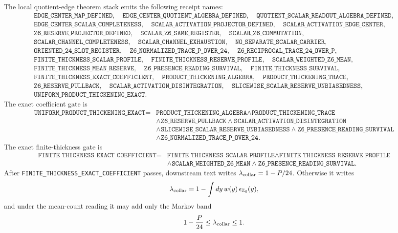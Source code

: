 \documentclass[11pt]{article}
\theoremstyle{remark}
\theoremstyle{plain}
\begin{document}
The local quotient-edge theorem stack emits the following receipt names:
\[
\begin{gathered}
\texttt{EDGE\_CENTER\_MAP\_DEFINED},\quad
\texttt{EDGE\_CENTER\_QUOTIENT\_ALGEBRA\_DEFINED},\quad
\texttt{QUOTIENT\_SCALAR\_READOUT\_ALGEBRA\_DEFINED},\\
\texttt{EDGE\_CENTER\_SCALAR\_COMPLETENESS},\quad
\texttt{SCALAR\_ACTIVATION\_PROJECTOR\_DEFINED},\quad
\texttt{SCALAR\_ACTIVATION\_EDGE\_CENTER},\\
\texttt{Z6\_RESERVE\_PROJECTOR\_DEFINED},\quad
\texttt{SCALAR\_Z6\_SAME\_REGISTER},\quad
\texttt{SCALAR\_Z6\_COMMUTATION},\\
\texttt{SCALAR\_CHANNEL\_COMPLETENESS},\quad
\texttt{SCALAR\_CHANNEL\_EXHAUSTION},\quad
\texttt{NO\_SEPARATE\_SCALAR\_CARRIER},\\
\texttt{ORIENTED\_24\_SLOT\_REGISTER},\quad
\texttt{Z6\_NORMALIZED\_TRACE\_P\_OVER\_24},\quad
\texttt{Z6\_RECIPROCAL\_TRACE\_24\_OVER\_P},\\
\texttt{FINITE\_THICKNESS\_SCALAR\_PROFILE},\quad
\texttt{FINITE\_THICKNESS\_RESERVE\_PROFILE},\quad
\texttt{SCALAR\_WEIGHTED\_Z6\_MEAN},\\
\texttt{FINITE\_THICKNESS\_MEAN\_RESERVE},\quad
\texttt{Z6\_PRESENCE\_READING\_SURVIVAL},\quad
\texttt{FINITE\_THICKNESS\_SURVIVAL},\\
\texttt{FINITE\_THICKNESS\_EXACT\_COEFFICIENT},\quad
\texttt{PRODUCT\_THICKENING\_ALGEBRA},\quad
\texttt{PRODUCT\_THICKENING\_TRACE},\\
\texttt{Z6\_RESERVE\_PULLBACK},\quad
\texttt{SCALAR\_ACTIVATION\_DISINTEGRATION},\quad
\texttt{SLICEWISE\_SCALAR\_RESERVE\_UNBIASEDNESS},\\
\texttt{UNIFORM\_PRODUCT\_THICKENING\_EXACT}.
\end{gathered}
\]
The exact coefficient gate is
\[
\begin{aligned}
\texttt{UNIFORM\_PRODUCT\_THICKENING\_EXACT}
={}&
\texttt{PRODUCT\_THICKENING\_ALGEBRA}
\wedge \texttt{PRODUCT\_THICKENING\_TRACE}\\
&\wedge \texttt{Z6\_RESERVE\_PULLBACK}
\wedge \texttt{SCALAR\_ACTIVATION\_DISINTEGRATION}\\
&\wedge \texttt{SLICEWISE\_SCALAR\_RESERVE\_UNBIASEDNESS}
\wedge \texttt{Z6\_PRESENCE\_READING\_SURVIVAL}\\
&\wedge \texttt{Z6\_NORMALIZED\_TRACE\_P\_OVER\_24}.
\end{aligned}
\]
The exact finite-thickness gate is
\[
\begin{aligned}
\texttt{FINITE\_THICKNESS\_EXACT\_COEFFICIENT}
={}&
\texttt{FINITE\_THICKNESS\_SCALAR\_PROFILE}
\wedge \texttt{FINITE\_THICKNESS\_RESERVE\_PROFILE}\\
&\wedge \texttt{SCALAR\_WEIGHTED\_Z6\_MEAN}
\wedge \texttt{Z6\_PRESENCE\_READING\_SURVIVAL}.
\end{aligned}
\]
After \texttt{FINITE\_THICKNESS\_EXACT\_COEFFICIENT} passes, downstream text
writes \(\lambda_{\rm collar}=1-P/24\). Otherwise it writes
\[
\lambda_{\rm collar}
=
1-\int dy\,w(y)\,\epsilon_{\mathbb Z_6}(y),
\]
and under the mean-count reading it may add only the Markov band
\[
1-\frac{P}{24}\le\lambda_{\rm collar}\le1.
\]
\end{document}
